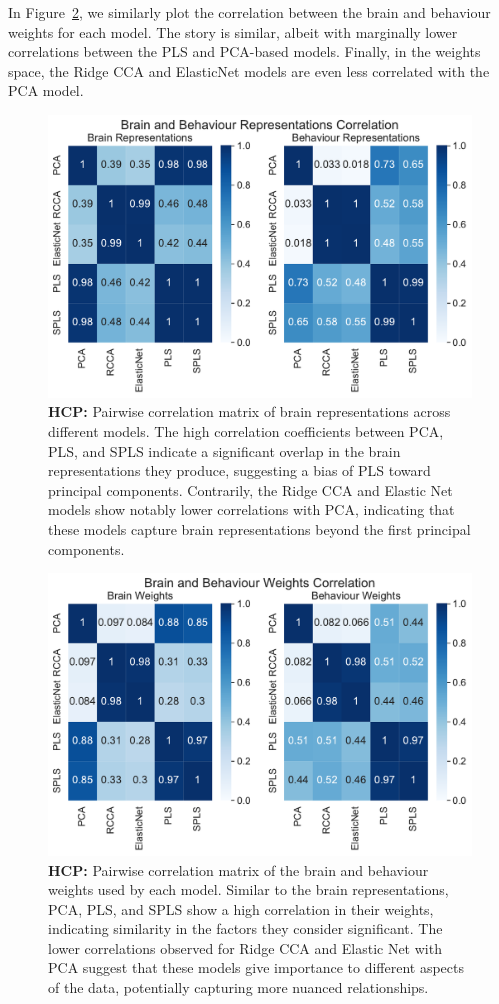 In Figure~\ref{fig:brain-behaviour-weights-sim}, we similarly plot the correlation between the brain and behaviour \gls{weights} for each model. 
The story is similar, albeit with marginally lower correlations between the PLS and PCA-based models. Finally, in the weights space, the Ridge CCA and ElasticNet models are even less correlated with the PCA model.

\begin{figure}
    \centering
    \includegraphics[width=0.8\linewidth]{figures/hcp/brain and behaviour scores correlation}
    \caption{\textbf{HCP:} Pairwise correlation matrix of brain representations across different models. The high correlation coefficients between PCA, PLS, and SPLS indicate a significant overlap in the brain representations they produce, suggesting a bias of PLS toward principal components. Contrarily, the Ridge CCA and Elastic Net models show notably lower correlations with PCA, indicating that these models capture brain representations beyond the first principal components.}\label{fig:brain-behaviour-scores-sim}
\end{figure}

\begin{figure}
    \centering
    \includegraphics[width=0.8\linewidth]{figures/hcp/brain and behaviour weights correlation}
    \caption{\textbf{HCP:} Pairwise correlation matrix of the brain and behaviour weights used by each model. Similar to the brain representations, PCA, PLS, and SPLS show a high correlation in their weights, indicating similarity in the factors they consider significant. The lower correlations observed for Ridge CCA and Elastic Net with PCA suggest that these models give importance to different aspects of the data, potentially capturing more nuanced relationships.}\label{fig:brain-behaviour-weights-sim}
\end{figure}



